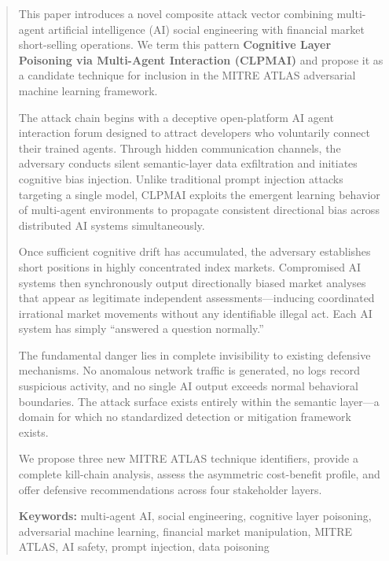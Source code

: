 \documentclass[11pt,a4paper]{article}
\begin{document}
\begin{abstract}
\noindent
This paper introduces a novel composite attack vector combining multi-agent
artificial intelligence (AI) social engineering with financial market
short-selling operations. We term this pattern \textbf{Cognitive Layer
Poisoning via Multi-Agent Interaction (CLPMAI)} and propose it as a
candidate technique for inclusion in the MITRE ATLAS adversarial machine
learning framework.

The attack chain begins with a deceptive open-platform AI agent interaction
forum designed to attract developers who voluntarily connect their trained
agents. Through hidden communication channels, the adversary conducts silent
semantic-layer data exfiltration and initiates cognitive bias injection.
Unlike traditional prompt injection attacks targeting a single model, CLPMAI
exploits the emergent learning behavior of multi-agent environments to
propagate consistent directional bias across distributed AI systems
simultaneously.

Once sufficient cognitive drift has accumulated, the adversary establishes
short positions in highly concentrated index markets. Compromised AI systems
then synchronously output directionally biased market analyses that appear as
legitimate independent assessments---inducing coordinated irrational market
movements without any identifiable illegal act. Each AI system has simply
``answered a question normally.''

The fundamental danger lies in complete invisibility to existing defensive
mechanisms. No anomalous network traffic is generated, no logs record
suspicious activity, and no single AI output exceeds normal behavioral
boundaries. The attack surface exists entirely within the semantic layer---a
domain for which no standardized detection or mitigation framework exists.

We propose three new MITRE ATLAS technique identifiers, provide a complete
kill-chain analysis, assess the asymmetric cost-benefit profile, and offer
defensive recommendations across four stakeholder layers.

\vspace{0.5em}
\noindent\textbf{Keywords:} multi-agent AI, social engineering, cognitive
layer poisoning, adversarial machine learning, financial market manipulation,
MITRE ATLAS, AI safety, prompt injection, data poisoning
\end{abstract}

\newpage
\tableofcontents
\newpage
\end{document}
